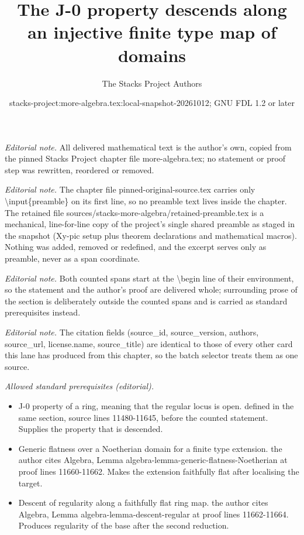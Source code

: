 \documentclass[10pt,a4paper]{amsart}
\title{The J-0 property descends along an injective finite type map of domains}
\author{The Stacks Project Authors}
\date{stacks-project:more-algebra.tex:local-snapshot-20261012; GNU FDL 1.2 or later}
\theoremstyle{plain}
\theoremstyle{definition}
\theoremstyle{remark}
\numberwithin{equation}{subsection}
\begin{document}
\maketitle
\setcounter{subsection}{1}
\noindent\textit{Editorial note.} All delivered mathematical text is the author's own, copied from the pinned Stacks Project chapter file more-algebra.tex; no statement or proof step was rewritten, reordered or removed.\par\medskip
\noindent\textit{Editorial note.} The chapter file pinned-original-source.tex carries only \textbackslash{}input\{preamble\} on its first line, so no preamble text lives inside the chapter. The retained file sources/stacks-more-algebra/retained-preamble.tex is a mechanical, line-for-line copy of the project's single shared preamble as staged in the snapshot (Xy-pic setup plus theorem declarations and mathematical macros). Nothing was added, removed or redefined, and the excerpt serves only as preamble, never as a span coordinate.\par\medskip
\noindent\textit{Editorial note.} Both counted spans start at the \textbackslash{}begin line of their environment, so the statement and the author's proof are delivered whole; surrounding prose of the section is deliberately outside the counted spans and is carried as standard prerequisites instead.\par\medskip
\noindent\textit{Editorial note.} The citation fields (source\_id, source\_version, authors, source\_url, license.name, source\_title) are identical to those of every other card this lane has produced from this chapter, so the batch selector treats them as one source.\par\medskip
\noindent\textit{Allowed standard prerequisites (editorial).}\begin{itemize}
\item J-0 property of a ring, meaning that the regular locus is open. defined in the same section, source lines 11480-11645, before the counted statement. Supplies the property that is descended.
\item Generic flatness over a Noetherian domain for a finite type extension. the author cites Algebra, Lemma algebra-lemma-generic-flatness-Noetherian at proof lines 11660-11662. Makes the extension faithfully flat after localising the target.
\item Descent of regularity along a faithfully flat ring map. the author cites Algebra, Lemma algebra-lemma-descent-regular at proof lines 11662-11664. Produces regularity of the base after the second reduction.
\end{itemize}\medskip
\end{document}
